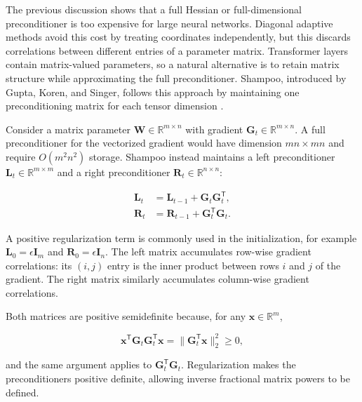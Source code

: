 The previous discussion shows that a full Hessian or full-dimensional
preconditioner is too expensive for large neural networks. Diagonal
adaptive methods avoid this cost by treating coordinates independently,
but this discards correlations between different entries of a parameter
matrix. Transformer layers contain matrix-valued parameters, so a
natural alternative is to retain matrix structure while approximating
the full preconditioner. Shampoo, introduced by Gupta, Koren, and
Singer, follows this approach by maintaining one preconditioning
matrix for each tensor dimension \parencite{Gupta2018Shampoo}.

Consider a matrix parameter
$\mathbf{W}\in\mathbb{R}^{m\times n}$ with gradient
$\mathbf{G}_t\in\mathbb{R}^{m\times n}$. A full preconditioner for the
vectorized gradient would have dimension $mn\times mn$ and require
$O(m^2n^2)$ storage. Shampoo instead maintains a left preconditioner
$\mathbf{L}_t\in\mathbb{R}^{m\times m}$ and a right preconditioner
$\mathbf{R}_t\in\mathbb{R}^{n\times n}$:

\begin{align}
    \mathbf{L}_t
    &=
    \mathbf{L}_{t-1}
    +
    \mathbf{G}_t\mathbf{G}_t^{\mathsf{T}},
    \label{eq:opt-shampoo-left}\\
    \mathbf{R}_t
    &=
    \mathbf{R}_{t-1}
    +
    \mathbf{G}_t^{\mathsf{T}}\mathbf{G}_t.
    \label{eq:opt-shampoo-right}
\end{align}

A positive regularization term is commonly used in the initialization,
for example
$\mathbf{L}_0=\epsilon\mathbf{I}_m$ and
$\mathbf{R}_0=\epsilon\mathbf{I}_n$. The left matrix accumulates
row-wise gradient correlations: its $(i,j)$ entry is the inner product
between rows $i$ and $j$ of the gradient. The right matrix similarly
accumulates column-wise gradient correlations.

Both matrices are positive semidefinite because, for any
$\mathbf{x}\in\mathbb{R}^{m}$,

\begin{equation}
    \mathbf{x}^{\mathsf{T}}
    \mathbf{G}_t\mathbf{G}_t^{\mathsf{T}}\mathbf{x}
    =
    \|\mathbf{G}_t^{\mathsf{T}}\mathbf{x}\|_2^2
    \geq0,
    \label{eq:opt-shampoo-psd}
\end{equation}

and the same argument applies to
$\mathbf{G}_t^{\mathsf{T}}\mathbf{G}_t$. Regularization makes the
preconditioners positive definite, allowing inverse fractional matrix
powers to be defined.

